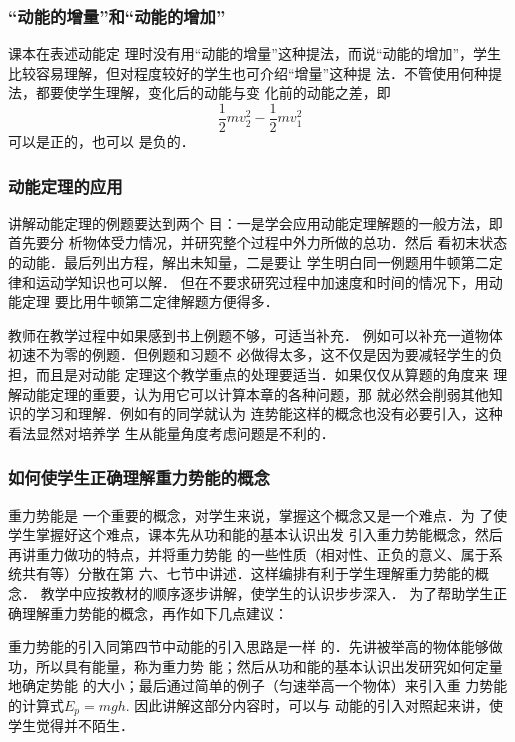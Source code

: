 \subsubsection{“动能的增量”和“动能的增加”}

课本在表述动能定
理时没有用“动能的增量”这种提法，而说“动能的增加”，学生
比较容易理解，但对程度较好的学生也可介绍“增量”这种提
法．不管使用何种提法，都要使学生理解，变化后的动能与变
化前的动能之差，即
\[\frac{1}{2}mv^2_2-\frac{1}{2}mv^2_1\]
可以是正的，也可以
是负的．

\subsubsection{动能定理的应用}

讲解动能定理的例题要达到两个
目：一是学会应用动能定理解题的一般方法，即首先要分
析物体受力情况，并研究整个过程中外力所做的总功．然后
看初末状态的动能．最后列出方程，解出未知量，二是要让
学生明白同一例题用牛顿第二定律和运动学知识也可以解．
但在不要求研究过程中加速度和时间的情况下，用动能定理
要比用牛顿第二定律解题方便得多．

教师在教学过程中如果感到书上例题不够，可适当补充．
例如可以补充一道物体初速不为零的例题．但例题和习题不
必做得太多，这不仅是因为要减轻学生的负担，而且是对动能
定理这个教学重点的处理要适当．如果仅仅从算题的角度来
理解动能定理的重要，认为用它可以计算本章的各种问题，那
就必然会削弱其他知识的学习和理解．例如有的同学就认为
连势能这样的概念也没有必要引入，这种看法显然对培养学
生从能量角度考虑问题是不利的．


\subsubsection{如何使学生正确理解重力势能的概念}

重力势能是
一个重要的概念，对学生来说，掌握这个概念又是一个难点．为
了使学生掌握好这个难点，课本先从功和能的基本认识出发
引入重力势能概念，然后再讲重力做功的特点，并将重力势能
的一些性质（相对性、正负的意义、属于系统共有等）分散在第
六、七节中讲述．这样编排有利于学生理解重力势能的概念．
教学中应按教材的顺序逐步讲解，使学生的认识步步深入．
为了帮助学生正确理解重力势能的概念，再作如下几点建议：
 
重力势能的引入同第四节中动能的引入思路是一样
的．先讲被举高的物体能够做功，所以具有能量，称为重力势
能；然后从功和能的基本认识出发研究如何定量地确定势能
的大小；最后通过简单的例子（匀速举高一个物体）来引入重
力势能的计算式$E_p=mgh$. 因此讲解这部分内容时，可以与
动能的引入对照起来讲，使学生觉得并不陌生．

